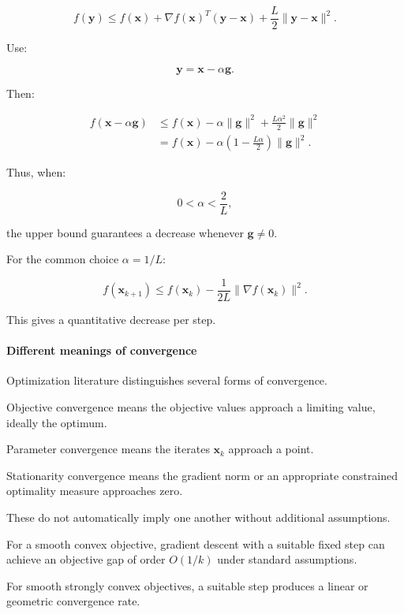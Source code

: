\[
f(\mathbf y) \le f(\mathbf x)+ \nabla f(\mathbf x)^T(\mathbf y-\mathbf x) +\frac L2\|\mathbf y-\mathbf x\|^2.
\]

Use:

\[
\mathbf y=\mathbf x-\alpha\mathbf g.
\]

Then:

\[
\begin{aligned} f(\mathbf x-\alpha\mathbf g) &\le f(\mathbf x) -\alpha\|\mathbf g\|^2 +\frac{L\alpha^2}{2}\|\mathbf g\|^2\\ &=f(\mathbf x) -\alpha\left(1-\frac{L\alpha}{2}\right)\|\mathbf g\|^2. \end{aligned}
\]

Thus, when:

\[
0<\alpha<\frac2L,
\]

the upper bound guarantees a decrease whenever \(\mathbf g\ne0\).

For the common choice \(\alpha=1/L\):

\[
\boxed{ f(\mathbf x_{k+1}) \le f(\mathbf x_k)- \frac1{2L}\|\nabla f(\mathbf x_k)\|^2 }.
\]

This gives a quantitative decrease per step.

\paragraph{Different meanings of convergence}\label{02-foundations-ii-ch026-different-meanings-of-convergence}

\hypertarget{02-foundations-ii-ch026-different-meanings-of-convergence}{}

Optimization literature distinguishes several forms of convergence.

Objective convergence means the objective values approach a limiting value, ideally the optimum.

Parameter convergence means the iterates \(\mathbf x_k\) approach a point.

Stationarity convergence means the gradient norm or an appropriate constrained optimality measure approaches zero.

These do not automatically imply one another without additional assumptions.

For a smooth convex objective, gradient descent with a suitable fixed step can achieve an objective gap of order \(O(1/k)\) under standard assumptions.

For smooth strongly convex objectives, a suitable step produces a linear or geometric convergence rate.

